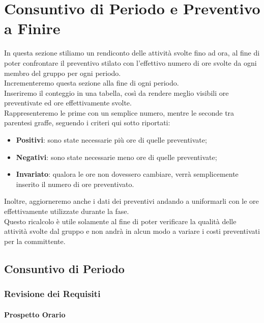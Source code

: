 \section{Consuntivo di Periodo e Preventivo a Finire}
\label{CFPPAF}

In questa sezione stiliamo un rendiconto delle attività svolte fino ad ora, al fine di poter confrontare il preventivo stilato con l'effettivo numero di ore svolte da ogni membro del gruppo per ogni periodo.\\
Incrementeremo questa sezione alla fine di ogni periodo.\\
Inseriremo il conteggio in una tabella, così da rendere meglio visibili ore preventivate ed ore effettivamente svolte.\\
Rappresenteremo le prime con un semplice numero, mentre le seconde tra parentesi graffe, seguendo i criteri qui sotto riportati:
\begin{itemize}
	\item \textbf{Positivi}: sono state necessarie più ore di quelle preventivate;
	\item \textbf{Negativi}: sono state necessarie meno ore di quelle preventivate;
	\item \textbf{Invariato}: qualora le ore non dovessero cambiare, verrà semplicemente inserito il numero di ore preventivato.	
\end{itemize}

Inoltre, aggiorneremo anche i dati dei preventivi andando a uniformarli con le ore effettivamente utilizzate durante la fase.\\
Questo ricalcolo è utile solamente al fine di poter verificare la qualità delle attività svolte dal gruppo e non andrà in alcun modo a variare i costi preventivati per la committente.

\newpage

\subsection{Consuntivo di Periodo}
\label{CFP}
\subsubsection{Revisione dei Requisiti}

\paragraph{Prospetto Orario} \-\\


